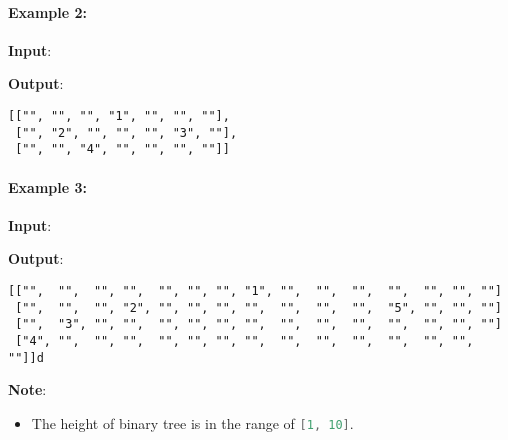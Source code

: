 \paragraph{Example 2:}

\begin{flushleft}
\textbf{Input}:
\begin{figure}[H]
\end{figure}

\textbf{Output}:
\begin{lstlisting}[style=customc, caption={}]
[["", "", "", "1", "", "", ""],
 ["", "2", "", "", "", "3", ""],
 ["", "", "4", "", "", "", ""]]
\end{lstlisting}
\end{flushleft}

\paragraph{Example 3:}

\begin{flushleft}
\textbf{Input}:
\begin{figure}[H]
\end{figure}
 
\textbf{Output}:
\begin{lstlisting}[style=customc, caption={}]
[["",  "",  "", "",  "", "", "", "1", "",  "",  "",  "",  "", "", ""]
 ["",  "",  "", "2", "", "", "", "",  "",  "",  "",  "5", "", "", ""]
 ["",  "3", "", "",  "", "", "", "",  "",  "",  "",  "",  "", "", ""]
 ["4", "",  "", "",  "", "", "", "",  "",  "",  "",  "",  "", "", ""]]d
\end{lstlisting}
\end{flushleft}

\textbf{Note}: 
\begin{itemize}
\item The height of binary tree is in the range of \lstinline[language=C++, basicstyle=\small\ttfamily, keywordstyle=\bfseries\color{green!40!black}]|[1, 10]|. 
\end{itemize}

